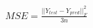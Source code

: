 \documentclass[preview]{standalone}
\begin{document}
\begin{align*}
MSE = \frac{||Y_{test} - Y_{pred}||_F^2}{3n}
\end{align*}
\end{document}
